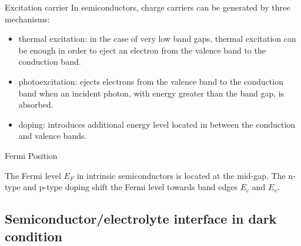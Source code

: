 \documentclass[10pt,compress]{beamer}
\begin{document}
    \begin{frame}[allowframebreaks=1.0]{Excitation carrier}
        In semiconductors, charge carriers can be generated by three mechanisms: 
        \begin{itemize}
            \item thermal excitation: in the case of very low band gaps, thermal excitation can be enough in order 
            to eject an electron from the valence band to the conduction band.
            \item photoexcitation: ejects electrons from the valence band to the conduction 
            band when an incident photon, with energy greater than the band gap, is absorbed.
            \item doping: introduces additional energy level located in between the conduction and 
            valence bands.
        \end{itemize}
        
        
    \end{frame}

    \begin{frame}{Fermi Position}
        
        The Fermi level $E_F$ in intrinsic semiconductors is located at the mid-gap. 
        The n-type and p-type doping shift the Fermi level towards band edges 
        $E_c$ and $E_v$.
    \end{frame}

\subsection{Semiconductor/electrolyte interface in dark condition}
\end{document}
